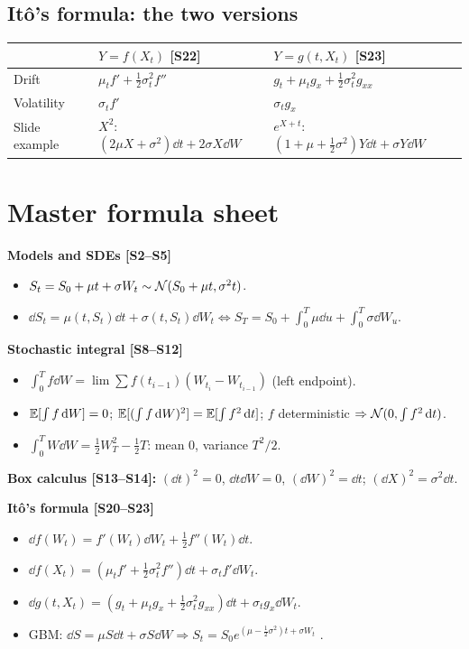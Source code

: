 \documentclass[10pt]{article}
\begin{document}
\subsection{It\^o's formula: the two versions}
{\small\begin{tabularx}{\linewidth}{@{}l X X@{}}\toprule
 & $Y=f(X_t)$ [S22] & $Y=g(t,X_t)$ [S23]\\\midrule
Drift & $\mu_tf'+\frac12\sigma_t^2f''$ & $g_t+\mu_tg_x+\frac12\sigma_t^2g_{xx}$\\
Volatility & $\sigma_tf'$ & $\sigma_tg_x$\\
Slide example & $X^2$: $(2\mu X+\sigma^2)\dd t+2\sigma X\dd W$ & $e^{X+t}$: $(1+\mu+\frac12\sigma^2)Y\dd t+\sigma Y\dd W$\\\bottomrule
\end{tabularx}}

\section{Master formula sheet}
\textbf{Models and SDEs [S2--S5]}
\begin{itemize}
\item $S_t=S_0+\mu t+\sigma W_t\sim\mathcal{N}(S_0+\mu t,\sigma^2t)$.
\item $\dd S_t=\mu(t,S_t)\dd t+\sigma(t,S_t)\dd W_t\iff S_T=S_0+\int_0^T\mu\dd u+\int_0^T\sigma\dd W_u$.
\end{itemize}
\textbf{Stochastic integral [S8--S12]}
\begin{itemize}
\item $\int_0^Tf\dd W=\lim\sum f(t_{i-1})(W_{t_i}-W_{t_{i-1}})$ (left endpoint).
\item $\mathbb{E}[\int f\,\mathrm{d} W]=0$; $\mathbb{E}[(\int f\,\mathrm{d} W)^2]=\mathbb{E}[\int f^2\,\mathrm{d} t]$; $f$ deterministic $\Rightarrow\mathcal{N}(0,\int f^2\,\mathrm{d} t)$.
\item $\int_0^TW\dd W=\frac12W_T^2-\frac12T$: mean 0, variance $T^2/2$.
\end{itemize}
\textbf{Box calculus [S13--S14]:} $(\dd t)^2=0$, $\dd t\dd W=0$, $(\dd W)^2=\dd t$; $(\dd X)^2=\sigma^2\dd t$.

\textbf{It\^o's formula [S20--S23]}
\begin{itemize}
\item $\dd f(W_t)=f'(W_t)\dd W_t+\frac12f''(W_t)\dd t$.
\item $\dd f(X_t)=(\mu_tf'+\frac12\sigma_t^2f'')\dd t+\sigma_tf'\dd W_t$.
\item $\dd g(t,X_t)=(g_t+\mu_tg_x+\frac12\sigma_t^2g_{xx})\dd t+\sigma_tg_x\dd W_t$.
\item GBM: $\dd S=\mu S\dd t+\sigma S\dd W\Rightarrow S_t=S_0e^{(\mu-\frac12\sigma^2)t+\sigma W_t}$ \beyond.
\end{itemize}
\end{document}
